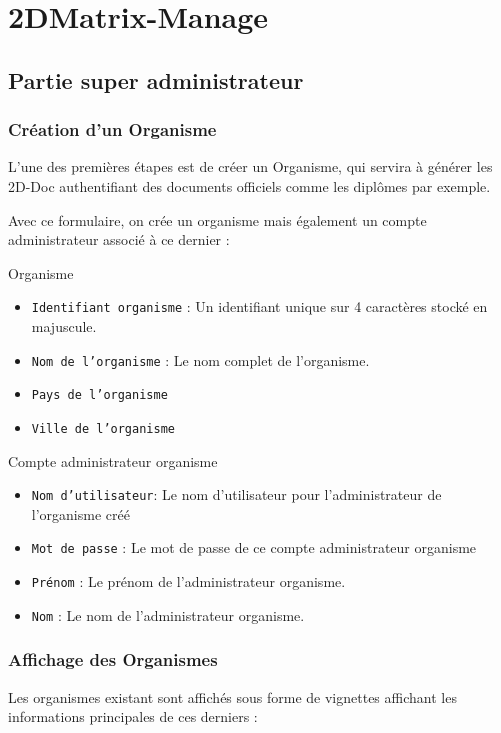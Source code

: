 \section{2DMatrix-Manage}
\subsection{Partie super administrateur}\label{managesupadm}
\subsubsection{Création d'un Organisme}
L'une des premières étapes est de créer un Organisme, qui servira à générer les 2D-Doc authentifiant des documents officiels comme les diplômes par exemple.

Avec ce formulaire, on crée un organisme mais également un compte administrateur associé à ce dernier :
\begin{center}
    Organisme
\end{center}
\begin{itemize}
    \item \texttt{Identifiant organisme} : Un identifiant unique sur 4 caractères stocké en majuscule.
    \item \texttt{Nom de l'organisme} : Le nom complet de l'organisme.
    \item \texttt{Pays de l'organisme}
    \item \texttt{Ville de l'organisme}
\end{itemize}
\begin{center}
    Compte administrateur organisme
\end{center}
\begin{itemize}
    \item \texttt{Nom d'utilisateur}: Le nom d'utilisateur pour l'administrateur de l'organisme créé
    \item \texttt{Mot de passe} : Le mot de passe de ce compte administrateur organisme
    \item \texttt{Prénom} : Le prénom de l'administrateur organisme. 
    \item \texttt{Nom} : Le nom de l'administrateur organisme.
\end{itemize}

\subsubsection{Affichage des Organismes}
Les organismes existant sont affichés sous forme de vignettes affichant les informations principales de ces derniers :

